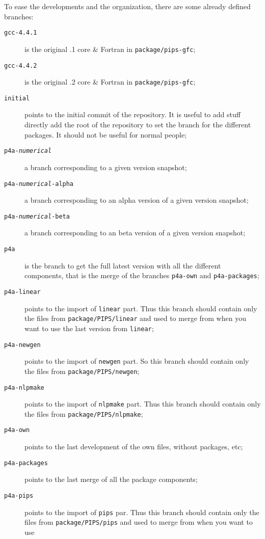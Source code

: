 \documentclass[a4paper]{article}
\begin{document}
To ease the developments and the organization, there are some already
defined branches:
\begin{description}
\item[\texttt{gcc-4.4.1}] is the original .1 core \& Fortran in
  \texttt{package/pips-gfc};
\item[\texttt{gcc-4.4.2}] is the original .2 core \& Fortran in
  \texttt{package/pips-gfc};
\item[\texttt{initial}] points to the initial commit of the \Apfa
  repository. It is useful to add stuff directly add the root of the
  repository to set the branch for the different packages. It should not
  be useful for normal people;
\item[\texttt{p4a-\emph{numerical}}] a branch corresponding to a given version
  snapshot;
\item[\texttt{p4a-\emph{numerical}-alpha}] a branch corresponding to an alpha
  version of a given version snapshot;
\item[\texttt{p4a-\emph{numerical}-beta}] a branch corresponding to an beta
  version of a given version snapshot;
\item[\texttt{p4a}] is the branch to get the full latest \Apfa version
  with all the different components, that is the merge of the branches
  \texttt{p4a-own} and \texttt{p4a-packages};
\item[\texttt{p4a-linear}] points to the import of \Apips \texttt{linear}
  part. Thus this branch should contain only the files from
  \texttt{package/PIPS/linear} and used to merge from when you want to use
  the last version from \texttt{linear};
\item[\texttt{p4a-newgen}] points to the import of \Apips \texttt{newgen}
  part. So this branch should contain only the files from
  \texttt{package/PIPS/newgen};
\item[\texttt{p4a-nlpmake}] points to the import of \Apips \texttt{nlpmake}
  part. Thus this branch should contain only the files from
  \texttt{package/PIPS/nlpmake};
\item[\texttt{p4a-own}] points to the last development of the \Apfa own files,
  without packages, etc;
\item[\texttt{p4a-packages}] points to the last merge of all the \Apfa
  package components;
\item[\texttt{p4a-pips}] points to the import of \Apips \texttt{pips}
  par. Thus this branch should contain only the files from
  \texttt{package/PIPS/pips} and used to merge from when you want to use

\end{description}
\end{document}

